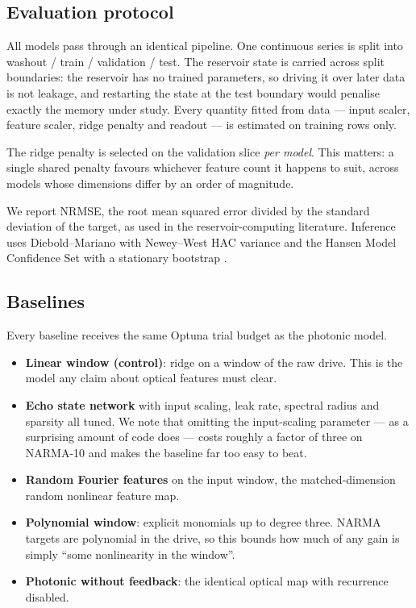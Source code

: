 \documentclass[11pt]{article}
\begin{document}
\subsection{Evaluation protocol}\label{sec:protocol}

All models pass through an identical pipeline. One continuous series is split into
washout / train / validation / test. The reservoir state is carried across split boundaries:
the reservoir has no trained parameters, so driving it over later data is not leakage, and
restarting the state at the test boundary would penalise exactly the memory under study. Every
quantity fitted from data --- input scaler, feature scaler, ridge penalty and readout --- is
estimated on training rows only.

The ridge penalty is selected on the validation slice \emph{per model}. This matters: a single
shared penalty favours whichever feature count it happens to suit, across models whose
dimensions differ by an order of magnitude.

We report NRMSE, the root mean squared error divided by the standard deviation of the target,
as used in the reservoir-computing literature. Inference uses Diebold--Mariano
\citep{diebold1995dm} with Newey--West HAC variance \citep{newey1987hac, andrews1991bandwidth}
and the Hansen Model Confidence Set \citep{hansen2011mcs} with a stationary bootstrap
\citep{politis1994stationary}.

\subsection{Baselines}\label{sec:baselines}

Every baseline receives the same Optuna trial budget as the photonic model.

\begin{itemize}
  \item \textbf{Linear window (control)}: ridge on a window of the raw drive. This is the
        model any claim about optical features must clear.
  \item \textbf{Echo state network} with input scaling, leak rate, spectral radius and
        sparsity all tuned. We note that omitting the input-scaling parameter --- as a
        surprising amount of code does --- costs roughly a factor of three on NARMA-10 and
        makes the baseline far too easy to beat.
  \item \textbf{Random Fourier features} \citep{rahimi2007rff} on the input window, the
        matched-dimension random nonlinear feature map.
  \item \textbf{Polynomial window}: explicit monomials up to degree three. NARMA targets are
        polynomial in the drive, so this bounds how much of any gain is simply ``some
        nonlinearity in the window''.
  \item \textbf{Photonic without feedback}: the identical optical map with recurrence
        disabled.
\end{itemize}
\end{document}
